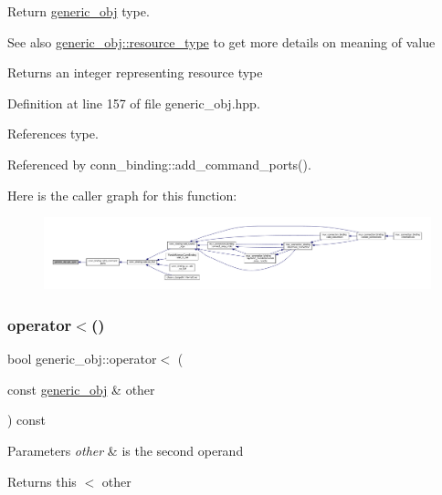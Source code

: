 Return \hyperlink{classgeneric__obj}{generic\+\_\+obj} type. 

\begin{DoxySeeAlso}{See also}
\hyperlink{classgeneric__obj_a340b4a97256b423ea4a86bfdf201ec65}{generic\+\_\+obj\+::resource\+\_\+type} to get more details on meaning of value 
\end{DoxySeeAlso}
\begin{DoxyReturn}{Returns}
an integer representing resource type 
\end{DoxyReturn}


Definition at line 157 of file generic\+\_\+obj.\+hpp.



References type.



Referenced by conn\+\_\+binding\+::add\+\_\+command\+\_\+ports().

Here is the caller graph for this function\+:
\nopagebreak
\begin{figure}[H]
\begin{center}
\leavevmode
\includegraphics[width=350pt]{d1/d64/classgeneric__obj_abbd8f729a1c6ab9b2e842f4d75c81422_icgraph}
\end{center}
\end{figure}
\mbox{\label{classgeneric__obj_a45eb078e658219090365fa966fa1a759}} 
\subsubsection{\texorpdfstring{operator$<$()}{operator<()}}
{\footnotesize\ttfamily bool generic\+\_\+obj\+::operator$<$ (\begin{DoxyParamCaption}\item[{const \hyperlink{classgeneric__obj}{generic\+\_\+obj} \&}]{other }\end{DoxyParamCaption}) const}


\begin{DoxyParams}{Parameters}
{\em other} & is the second operand \\
\hline
\end{DoxyParams}
\begin{DoxyReturn}{Returns}
this $<$ other 
\end{DoxyReturn}


